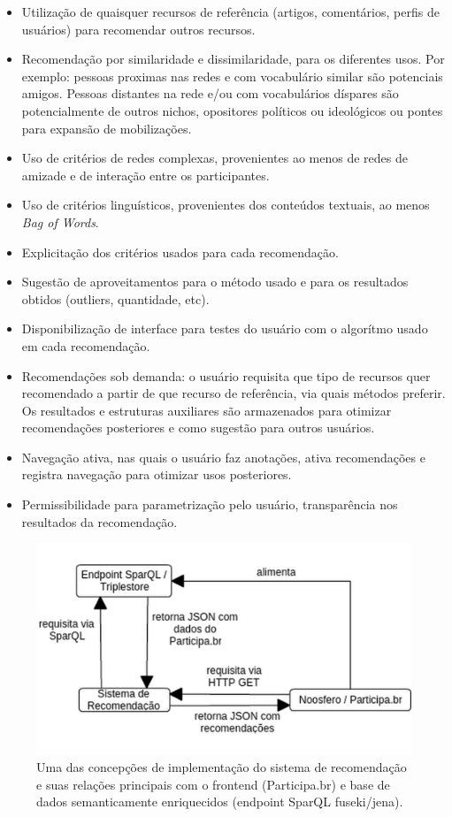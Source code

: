\documentclass[a4paper, 11pt]{article} %
\begin{document}
\begin{itemize}
    \item Utilização de quaisquer recursos de referência (artigos, comentários, perfis de usuários) para recomendar outros recursos.
    \item Recomendação por similaridade e dissimilaridade, para os diferentes usos. Por exemplo: pessoas proximas nas redes e com vocabulário similar são potenciais amigos. Pessoas distantes na rede e/ou com vocabulários díspares são potencialmente de outros nichos, opositores políticos ou ideológicos ou pontes para expansão de mobilizações.
    \item Uso de critérios de redes complexas, provenientes ao menos de redes de amizade e de interação entre os participantes.
    \item Uso de critérios linguísticos, provenientes dos conteúdos textuais, ao menos \emph{Bag of Words}.
    \item Explicitação dos critérios usados para cada recomendação.
    \item Sugestão de aproveitamentos para o método usado e para os resultados obtidos (outliers, quantidade, etc).
    \item Disponibilização de interface para testes do usuário com o algorítmo usado em cada recomendação.
    \item Recomendações sob demanda: o usuário requisita que tipo de recursos quer recomendado a partir de que recurso de referência, via quais métodos preferir. Os resultados e estruturas auxiliares são armazenados para otimizar recomendações posteriores e como sugestão para outros usuários.
    \item Navegação ativa, nas quais o usuário faz anotações, ativa recomendações e registra navegação para otimizar usos posteriores.
    \item Permissibilidade para parametrização pelo usuário, transparência nos resultados da recomendação.
\end{itemize}
\begin{figure}[h!]
  \centering
    \includegraphics[width=.7\textwidth]{sr.png}
  \caption{\small Uma das concepções de implementação do sistema de recomendação e suas relações principais com o frontend (Participa.br) e base de dados semanticamente enriquecidos (endpoint SparQL fuseki/jena).}\label{fig:rec}
\end{figure}
\end{document}
